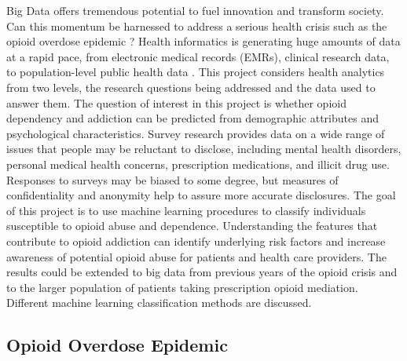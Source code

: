 \documentclass[sigconf]{acmart}
\begin{document}
Big Data offers tremendous potential to fuel innovation and transform society. 
Can this momentum be harnessed to address a serious health crisis such as the 
opioid overdose epidemic \cite{cdc16}? Health informatics is generating huge 
amounts of data at a rapid pace, from electronic medical records (EMRs), 
clinical research data, to population-level public health data \cite{herland14}. 
This project considers health analytics from two levels, the research questions 
being addressed and the data used to answer them. The question of interest in 
this project is whether opioid dependency and addiction can be predicted from 
demographic attributes and psychological characteristics. Survey research 
provides data on a wide range of issues that people may be reluctant to 
disclose, including mental health disorders, personal medical health concerns, prescription medications, and illicit drug use. Responses to surveys may be 
biased to some degree, but measures of confidentiality and anonymity help to assure more accurate disclosures. The goal of this project is to use machine 
learning procedures to classify individuals susceptible to opioid abuse and dependence. Understanding the features that contribute to opioid addiction 
can identify underlying risk factors and increase awareness of potential 
opioid abuse for patients and health care providers. The results could be 
extended to big data from previous years of the opioid crisis and to the 
larger population of patients taking prescription opioid mediation. Different machine learning classification methods are discussed.


\subsection{Opioid Overdose Epidemic}
\end{document}
